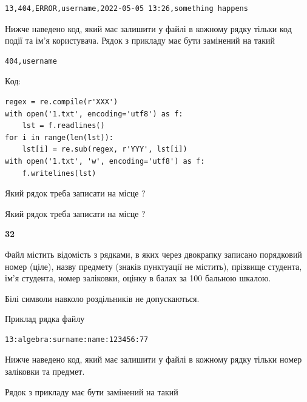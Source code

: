 \begin{verbatim}
13,404,ERROR,username,2022-05-05 13:26,something happens
\end{verbatim}


Нижче наведено код, який має залишити у файлі в кожному рядку тільки код події та ім'я користувача. Рядок з прикладу має бути замінений на такий



\begin{verbatim}
404,username
\end{verbatim}




Код:



\begin{verbatim}
regex = re.compile(r'XXX')
with open('1.txt', encoding='utf8') as f:
    lst = f.readlines()
for i in range(len(lst)):
    lst[i] = re.sub(regex, r'YYY', lst[i])
with open('1.txt', 'w', encoding='utf8') as f:
    f.writelines(lst)
\end{verbatim}







Який рядок треба записати на місце  ?\par
\vspace{5mm}


Який рядок треба записати на місце  ?\par


\newpage

{\begin {center}\textbf{ 32}\end {center}}\par
Файл  містить відомість з рядками, в яких через двокрапку записано поряд\-ковий номер (ціле), назву предмету (знаків пунктуації не містить), прізвище студента, ім'я студента, номер заліковки, оцінку в балах за 100 бальною шкалою.

Білі символи навколо роздільників не допускаються.

Приклад рядка файлу



\begin{verbatim}
13:algebra:surname:name:123456:77
\end{verbatim}


Нижче наведено код, який має залишити у файлі в кожному рядку тільки номер заліковки та предмет.

Рядок з прикладу має бути замінений на такий



